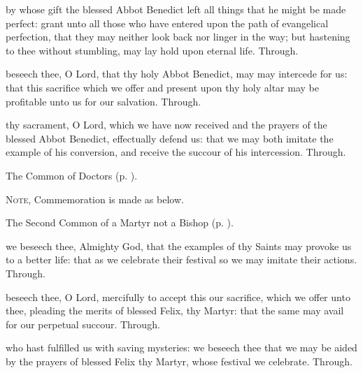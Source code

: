 \collect
{} by whose gift the blessed Abbot Benedict left all things that he might be made perfect: grant unto all those who have entered upon the path of evangelical perfection, that they may neither look back nor linger in the way; but hastening to thee without stumbling, may lay hold upon eternal life. Through.

\secret
{} beseech thee, O Lord, that thy holy Abbot Benedict, may may intercede for us: that this sacrifice which we offer and present upon thy holy altar may be profitable unto us for our salvation. Through.

\postcommunion
{} thy sacrament, O Lord, which we have now received and the prayers of the blessed Abbot Benedict, effectually defend us: that we may both imitate the example of his conversion, and receive the succour of his intercession. Through.



\begin{rubric}
	The Common of Doctors (p. \pageref{CommonDoctors}).
\end{rubric}

\begin{rubric}
	\textsc{Note,} Commemoration is made  as below.
\end{rubric}



\begin{rubric}
	The Second Common of a Martyr not a Bishop (p. \pageref{CommonMartyrNotBishopII}).\par
\end{rubric}

\collect
{} we beseech thee, Almighty God, that the examples of thy Saints may provoke us to a better life: that as we celebrate their festival so we may imitate their actions. Through.

\secret
{} beseech thee, O Lord, mercifully to accept this our sacrifice, which we offer unto thee, pleading the merits of blessed Felix, thy Martyr: that the same may avail for our perpetual succour. Through.

\postcommunion
{} who hast fulfilled us with saving mysteries: we beseech thee that we may be aided by the prayers of blessed Felix thy Martyr, whose festival we celebrate. Through.


